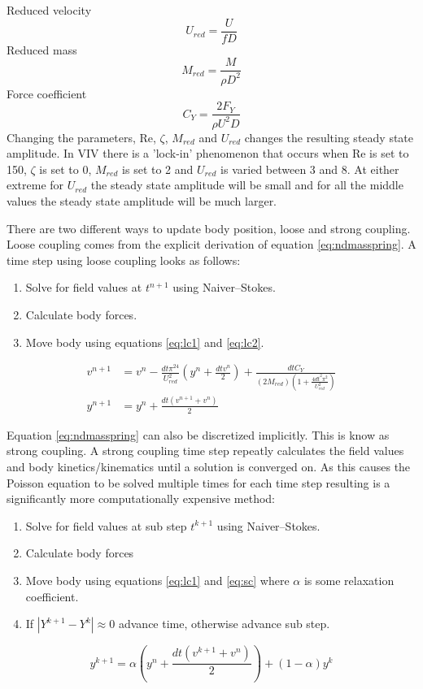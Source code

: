 Reduced velocity
\begin{equation}
U_{red}=\frac{U}{fD}\label{eq:reduced velocity}
\end{equation}
Reduced mass
\begin{equation}
M_{red}=\frac{M}{\rho D^2}\label{eq:reduced mass}
\end{equation}
Force coefficient
\begin{equation}
C_Y=\frac{2F_Y}{\rho U^2 D}\label{eq:force coefficient}
\end{equation}
Changing the parameters, Re, $\zeta$, $M_{red}$ and $U_{red}$ changes the resulting steady state amplitude. 
In VIV there is a 'lock-in' phenomenon that occurs when Re is set to 150, $\zeta$ is set to 0, $M_{red}$ is set to 2 and $U_{red}$ is varied between 3 and 8. 
At either extreme for $U_{red}$ the steady state amplitude will be small and for all the middle values the steady state amplitude will be much larger. 

There are two different ways to update body position, loose and strong coupling. 
Loose coupling comes from the explicit derivation of equation \eqref{eq:ndmasspring}.
A time step using loose coupling looks as follows:
\begin{enumerate}
	\item Solve for field values at $t^{n+1}$ using Naiver--Stokes.
	\item Calculate body forces.
	\item Move body using equations \eqref{eq:lc1} and \eqref{eq:lc2}.
\end{enumerate}
\begin{align}
v^{n+1} &= v^n-\frac{dt\pi^24}{U_{red}^2}\left(y^n+\frac{dtv^n}{2}\right) + \frac{dtC_Y}{\left(2M_{red}\right)\left(1+\frac{4dt^2\pi^2}{U_{red}^2}\right)} \label{eq:lc1} \\
y^{n+1} &= y^n +\frac{dt\left(v^{n+1}+v^n\right)}{2}\; \label{eq:lc2}
\end{align}

Equation \eqref{eq:ndmasspring} can also be discretized implicitly.
This is know as strong coupling.
A strong coupling time step repeatly calculates the field values and body kinetics/kinematics until a solution is converged on.
As this causes the Poisson equation to be solved multiple times for each time step resulting is a significantly more computationally expensive method:
\begin{enumerate}
	\item Solve for field values at sub step $t^{k+1}$ using Naiver--Stokes.
	\item Calculate body forces
	\item Move body using equations \eqref{eq:lc1} and \eqref{eq:sc} where $\alpha$ is some relaxation coefficient.
	\item If $|Y^{k+1}-Y^k| \approx 0$ advance time, otherwise advance sub step.
\end{enumerate}
\begin{equation}
y^{k+1} = \alpha \left(y^n+\frac{dt\left(v^{k+1}+v^n\right)}{2}\right) +\left(1-\alpha\right)y^k\label{eq:sc}
\end{equation}

